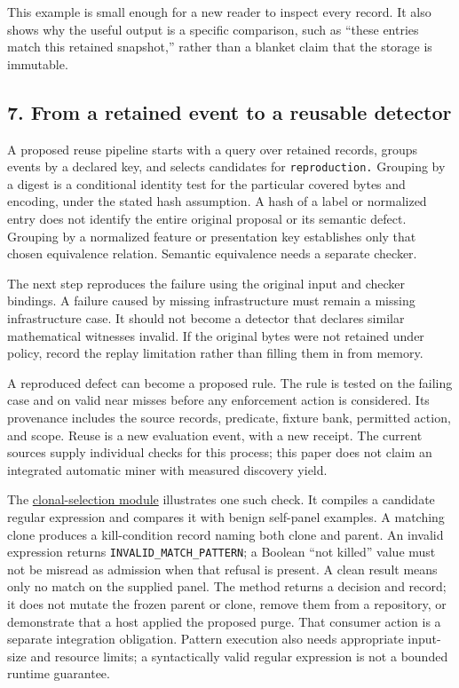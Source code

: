 \documentclass[
  11pt,
]{article}
\begin{document}
This example is small enough for a new reader to inspect every record.
It also shows why the useful output is a specific comparison, such as
``these entries match this retained snapshot,'' rather than a blanket
claim that the storage is immutable.

\subsection{7. From a retained event to a reusable
detector}\label{from-a-retained-event-to-a-reusable-detector}

A proposed reuse pipeline starts with a query over retained records,
groups events by a declared key, and selects candidates for
\nolinkurl{reproduction.} Grouping by a digest is a conditional identity
test for the particular covered bytes and encoding, under the stated
hash assumption. A hash of a label or normalized entry does not identify
the entire original proposal or its semantic defect. Grouping by a
normalized feature or presentation key establishes only that chosen
equivalence relation. Semantic equivalence needs a separate checker.

The next step reproduces the failure using the original input and
checker bindings. A failure caused by missing infrastructure must remain
a missing infrastructure case. It should not become a detector that
declares similar mathematical witnesses invalid. If the original bytes
were not retained under policy, record the replay limitation rather than
filling them in from memory.

A reproduced defect can become a proposed rule. The rule is tested on
the failing case and on valid near misses before any enforcement action
is considered. Its provenance includes the source records, predicate,
fixture bank, permitted action, and scope. Reuse is a new evaluation
event, with a new receipt. The current sources supply individual checks
for this process; this paper does not claim an integrated automatic
miner with measured discovery yield.

The
\href{https://github.com/dbccpage/the_symbol_game/blob/52cb5457f6c485ba548cfd292f6012a941ed22cf/pfp/domain/immune/clonal_selection.py}{clonal-selection
module} illustrates one such check. It compiles a candidate regular
expression and compares it with benign self-panel examples. A matching
clone produces a kill-condition record naming both clone and parent. An
invalid expression returns \nolinkurl{INVALID_MATCH_PATTERN}; a Boolean
``not killed'' value must not be misread as admission when that refusal
is present. A clean result means only no match on the supplied panel.
The method returns a decision and record; it does not mutate the frozen
parent or clone, remove them from a repository, or demonstrate that a
host applied the proposed purge. That consumer action is a separate
integration obligation. Pattern execution also needs appropriate
input-size and resource limits; a syntactically valid regular expression
is not a bounded runtime guarantee.
\end{document}
